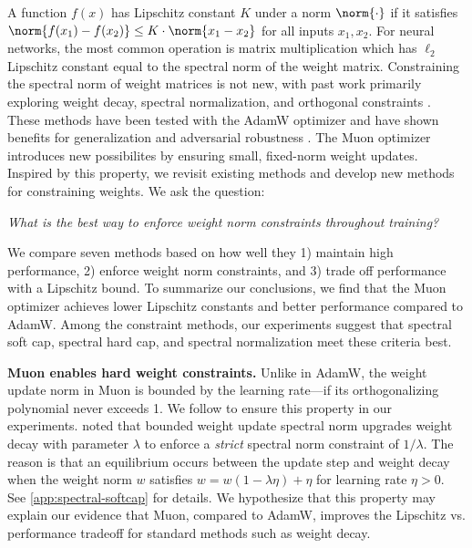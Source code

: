 A function $f(x)$ has Lipschitz constant $K$ under a norm $\norm{\cdot}$ if it satisfies $\norm{f(x_1) - f(x_2)} \leq K \cdot \norm{x_1 - x_2}$ for all inputs $x_1, x_2$. For neural networks, the most common operation is matrix multiplication which has $\ell_2$ Lipschitz constant equal to the spectral norm of the weight matrix. Constraining the spectral norm of weight matrices is not new, with past work primarily exploring weight decay, spectral normalization, and orthogonal constraints \citep{krogh1991simple,yoshida2017spectralnormregularizationimproving,miyato2018spectralnormalizationgenerativeadversarial,gouk2020regularisationneuralnetworksenforcing,kexuefm-spectral-weight-decay}. These methods have been tested with the AdamW optimizer and have shown benefits for generalization and adversarial robustness \citep{bartlett2017spectrallynormalizedmarginboundsneural,tsuzuku2018lipschitzmargintrainingscalablecertification}. The Muon optimizer introduces new possibilites by ensuring small, fixed-norm weight updates. Inspired by this property, we revisit existing methods and develop new methods for constraining weights. We ask the question:

\begin{center}
    \textit{What is the best way to enforce weight norm constraints throughout training?}
\end{center}

We compare seven methods based on how well they 1) maintain high performance, 2) enforce weight norm constraints, and 3) trade off performance with a Lipschitz bound. To summarize our conclusions, we find that the Muon optimizer achieves lower Lipschitz constants and better performance compared to AdamW. Among the constraint methods, our experiments suggest that spectral soft cap, spectral hard cap, and spectral normalization meet these criteria best.

\textbf{Muon enables hard weight constraints.} Unlike in AdamW, the weight update norm in Muon is bounded by the learning rate---if its orthogonalizing polynomial never exceeds 1. We follow \citep{You2025} to ensure this property in our experiments. \citet{pethick2025trainingdeeplearningmodels} noted that bounded weight update spectral norm upgrades weight decay with parameter $\lambda$ to enforce a \textit{strict} spectral norm constraint of $1/\lambda$. The reason is that an equilibrium occurs between the update step and weight decay when the weight norm $w$ satisfies $w = w(1 - \lambda \eta) + \eta$ for learning rate $\eta > 0$. See \cref{app:spectral-softcap} for details. We hypothesize that this property may explain our evidence that Muon, compared to AdamW, improves the Lipschitz vs. performance tradeoff for standard methods such as weight decay.

